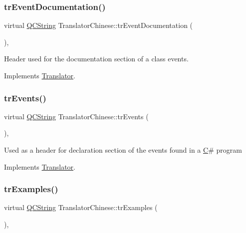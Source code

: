 \subsubsection{\texorpdfstring{trEventDocumentation()}{trEventDocumentation()}}
{\footnotesize\ttfamily virtual \mbox{\hyperlink{class_q_c_string}{Q\+C\+String}} Translator\+Chinese\+::tr\+Event\+Documentation (\begin{DoxyParamCaption}{ }\end{DoxyParamCaption})\hspace{0.3cm}{\ttfamily [inline]}, {\ttfamily [virtual]}}

Header used for the documentation section of a class\textquotesingle{} events. 

Implements \mbox{\hyperlink{class_translator}{Translator}}.

\mbox{\label{class_translator_chinese_ad562702b2a77d308bb44fcb408687d8e}} 
\subsubsection{\texorpdfstring{trEvents()}{trEvents()}}
{\footnotesize\ttfamily virtual \mbox{\hyperlink{class_q_c_string}{Q\+C\+String}} Translator\+Chinese\+::tr\+Events (\begin{DoxyParamCaption}{ }\end{DoxyParamCaption})\hspace{0.3cm}{\ttfamily [inline]}, {\ttfamily [virtual]}}

Used as a header for declaration section of the events found in a \mbox{\hyperlink{class_c}{C}}\# program 

Implements \mbox{\hyperlink{class_translator}{Translator}}.

\mbox{\label{class_translator_chinese_a646a38b296d5f3976f71a2cac754f535}} 
\subsubsection{\texorpdfstring{trExamples()}{trExamples()}}
{\footnotesize\ttfamily virtual \mbox{\hyperlink{class_q_c_string}{Q\+C\+String}} Translator\+Chinese\+::tr\+Examples (\begin{DoxyParamCaption}{ }\end{DoxyParamCaption})\hspace{0.3cm}{\ttfamily [inline]}, {\ttfamily [virtual]}}

